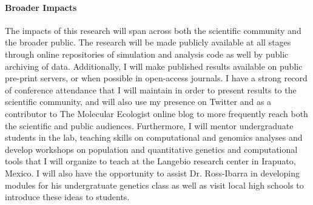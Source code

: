 \vspace{-0.4cm}

\paragraph{Broader Impacts}

The impacts of this research will span across both the scientific community and the broader public. The research will be made publicly available at all stages through online repositories of simulation and analysis code as well by public archiving of data. Additionally, I will make published results available on public pre-print servers, or when possible in open-access journals. I have a strong record of conference attendance that I will maintain in order to present results to the scientific community, and will also use my presence on Twitter and as a contributor to The Molecular Ecologist online blog to more frequently reach both the scientific and public audiences. Furthermore, I will mentor undergraduate students in the lab, teaching skills on computational and genomics analyses and develop workshops on population and quantitative genetics and computational tools that I will organize to teach at the Langebio research center in Irapuato, Mexico. I will also have the opportunity to assist Dr. Ross-Ibarra in developing modules for his undergratuate genetics class as well as visit local high schools to introduce these ideas to students.






